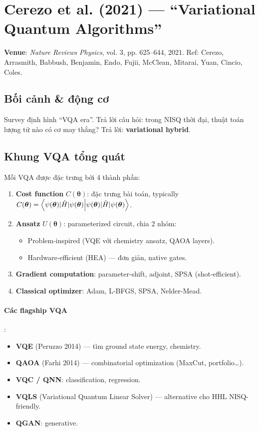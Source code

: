 \documentclass[11pt,a4paper]{article}
\begin{document}
\section{Cerezo et al. (2021) --- ``Variational Quantum Algorithms''}

\textbf{Venue}: \textit{Nature Reviews Physics}, vol. 3, pp. 625--644, 2021. Ref: Cerezo, Arrasmith, Babbush, Benjamin, Endo, Fujii, McClean, Mitarai, Yuan, Cincio, Coles.

\subsection{Bối cảnh \& động cơ}

Survey định hình ``VQA era''. Trả lời câu hỏi: trong NISQ thời đại, thuật toán lượng tử nào có cơ may thắng? Trả lời: \textbf{variational hybrid}.

\subsection{Khung VQA tổng quát}

Mỗi VQA được đặc trưng bởi 4 thành phần:

\begin{enumerate}
  \item \textbf{Cost function} $C(\boldsymbol{\theta})$: đặc trưng bài toán, typically $C(\boldsymbol{\theta}) = \braket{\psi(\boldsymbol{\theta})|\hat{H}|\psi(\boldsymbol{\theta})}$.
  \item \textbf{Ansatz} $U(\boldsymbol{\theta})$: parameterized circuit, chia 2 nhóm:
    \begin{itemize}
      \item Problem-inspired (VQE với chemistry ansatz, QAOA layers).
      \item Hardware-efficient (HEA) --- đơn giản, native gates.
    \end{itemize}
  \item \textbf{Gradient computation}: parameter-shift, adjoint, SPSA (shot-efficient).
  \item \textbf{Classical optimizer}: Adam, L-BFGS, SPSA, Nelder-Mead.
\end{enumerate}

\paragraph{Các flagship VQA}:
\begin{itemize}
  \item \textbf{VQE} (Peruzzo 2014) --- tìm ground state energy, chemistry.
  \item \textbf{QAOA} (Farhi 2014) --- combinatorial optimization (MaxCut, portfolio\dots).
  \item \textbf{VQC / QNN}: classification, regression.
  \item \textbf{VQLS} (Variational Quantum Linear Solver) --- alternative cho HHL NISQ-friendly.
  \item \textbf{QGAN}: generative.
\end{itemize}
\end{document}
